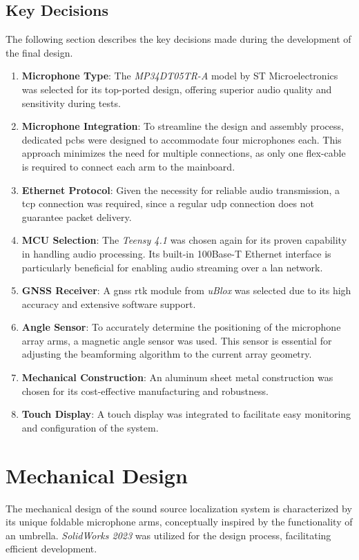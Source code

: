 \subsection{Key Decisions}
The following section describes the key decisions made during the development of the final design.
\begin{enumerate}
	\item \textbf{Microphone Type}: The \textit{MP34DT05TR-A} model by ST Microelectronics was selected for its top-ported design, offering superior audio quality and sensitivity during tests.
	\item \textbf{Microphone Integration}: To streamline the design and assembly process, dedicated \acrshort{pcb}s were designed to accommodate four microphones each.
	      This approach minimizes the need for multiple connections, as only one flex-cable is required to connect each arm to the mainboard.
	\item \textbf{Ethernet Protocol}: Given the necessity for reliable audio transmission, a \acrshort{tcp} connection was required, since a regular \acrshort{udp} connection does not guarantee packet delivery.
	\item \textbf{MCU Selection}: The \textit{Teensy 4.1} was chosen again for its proven capability in handling audio processing.
	      Its built-in 100Base-T Ethernet interface is particularly beneficial for enabling audio streaming over a \acrshort{lan} network.
	\item \textbf{GNSS Receiver}: A \acrshort{gnss} \acrshort{rtk} module from \textit{uBlox} was selected due to its high accuracy and extensive software support.
	\item \textbf{Angle Sensor}: To accurately determine the positioning of the microphone array arms, a magnetic angle sensor was used.
	      This sensor is essential for adjusting the beamforming algorithm to the current array geometry.
	\item \textbf{Mechanical Construction}: An aluminum sheet metal construction was chosen for its cost-effective manufacturing and robustness.
	\item \textbf{Touch Display}: A touch display was integrated to facilitate easy monitoring and configuration of the system.
\end{enumerate}
\newpage

\section{Mechanical Design}
The mechanical design of the sound source localization system is characterized by its unique foldable microphone arms, conceptually inspired by the functionality of an umbrella.
\textit{SolidWorks 2023} was utilized for the design process, facilitating efficient development.

